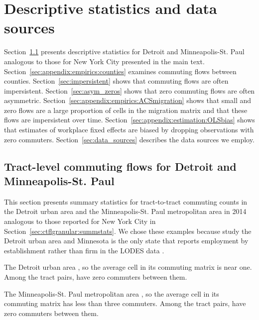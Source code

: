 \documentclass[11pt]{article}
\theoremstyle{definition}
\begin{document}
\section{Descriptive statistics and data sources}\label{sec:appendix:empirics}

Section~\ref{sec:DetroitMSP} presents descriptive statistics for Detroit and Minneapolis-St. Paul analogous to those for New York City presented in the main text.
Section~\ref{sec:appendix:empirics:counties} examines commuting flows between counties.
Section~\ref{sec:impersistent} shows that commuting flows are often impersistent.
Section~\ref{sec:asym_zeros} shows that zero commuting flows are often asymmetric.
Section~\ref{sec:appendix:empirics:ACSmigration} shows that small and zero flows are a large proportion of cells in the migration matrix and that these flows are impersistent over time.
Section~\ref{sec:appendix:estimation:OLSbias}  shows that estimates of workplace fixed effects are biased by dropping observations with zero commuters.
Section~\ref{sec:data_sources} describes the data sources we employ.

\subsection{Tract-level commuting flows for Detroit and Minneapolis-St. Paul} \label{sec:DetroitMSP}

This section presents summary statistics for tract-to-tract commuting counts in the Detroit urban area and the Minneapolis-St. Paul metropolitan area in 2014 
analogous to those reported for New York City in Section~\ref{sec:ctflgranular:summstats}.
We chose these examples because
 study the Detroit urban area
and
Minnesota is the only state that reports employment by establishment rather than firm in the LODES data .

The Detroit urban area ,
so the average cell in its commuting matrix is near one.
Among the tract pairs, 
%
have zero commuters between them.


The Minneapolis-St. Paul metropolitan area , 
so the average cell in its commuting matrix has less than three commuters.
Among the tract pairs,
%
have zero commuters between them.

\end{document}
